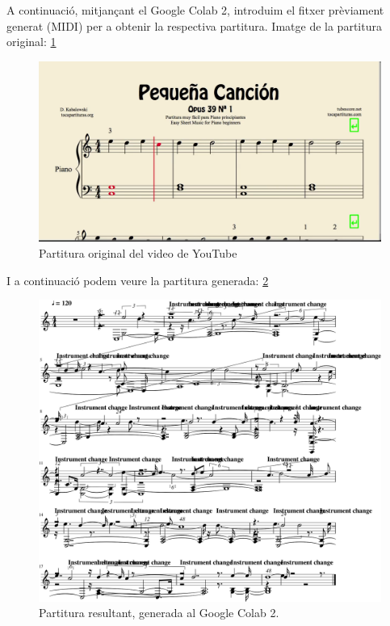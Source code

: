\documentclass[10pt,a4paper,twocolumn,twoside]{article}
\begin{document}
A continuació, mitjançant el Google Colab 2, introduim el fitxer prèviament generat (MIDI) per a obtenir la respectiva partitura.
Imatge de la partitura original: \ref{fig:paritura-original}
\begin{figure}[h]
    \centering
    \includegraphics[width=1\linewidth]{img/screenshot-partitura-correcta.png}
    \caption{Partitura original del video de YouTube}
    \label{fig:paritura-original}
\end{figure}

I a continuació podem veure la partitura generada: \ref{fig:partitura-resultat}
\begin{figure}[h]
    \centering
    \includegraphics[width=1\linewidth]{img/partitura_resultat.png}
    \caption{Partitura resultant, generada al Google Colab 2.}
    \label{fig:partitura-resultat}
\end{figure}
\end{document}

